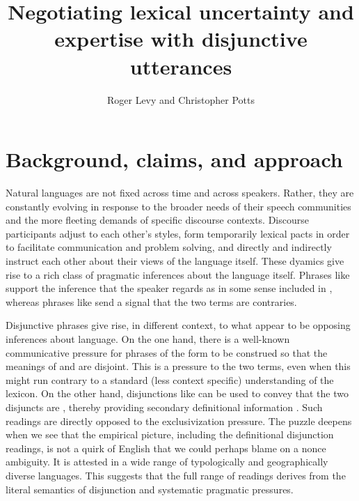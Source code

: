 \documentclass{article}
\begin{document}

\title{Negotiating lexical uncertainty and expertise with disjunctive utterances}
\author{Roger Levy and Christopher Potts}
\maketitle


\section{Background, claims, and approach}\label{sec:introduction}

Natural languages are not fixed across time and across speakers.
Rather, they are constantly evolving in response to the broader needs
of their speech communities and the more fleeting demands of specific
discourse contexts. Discourse participants adjust to each other's
styles, form temporarily lexical pacts in order to facilitate
communication and problem solving, and directly and indirectly
instruct each other about their views of the language itself. These
dyamics give rise to a rich class of pragmatic inferences about the
language itself. Phrases like  support the
inference that the speaker regards  as in some sense included
in , whereas phrases like  send a signal
that the two terms are contraries.

Disjunctive phrases give rise, in different context, to what appear to
be opposing inferences about language. On the one hand, there is a
well-known communicative pressure for phrases of the form  to be construed so that the meanings of  and  are
disjoint. This is a pressure to  the two terms, even
when this might run contrary to a standard (less context specific)
understanding of the lexicon.  On the other hand, disjunctions like
 can be used to convey that the two
disjuncts are , thereby providing secondary
definitional information \citep{Horn89,Rohdenburg:1985}. Such readings
are directly opposed to the exclusivization pressure.  The puzzle
deepens when we see that the empirical picture, including the
definitional disjunction readings, is not a quirk of English that we
could perhaps blame on a nonce ambiguity. It is attested in a wide
range of typologically and geographically diverse languages. This
suggests that the full range of readings derives from the literal
semantics of disjunction and systematic pragmatic pressures.
\end{document}
